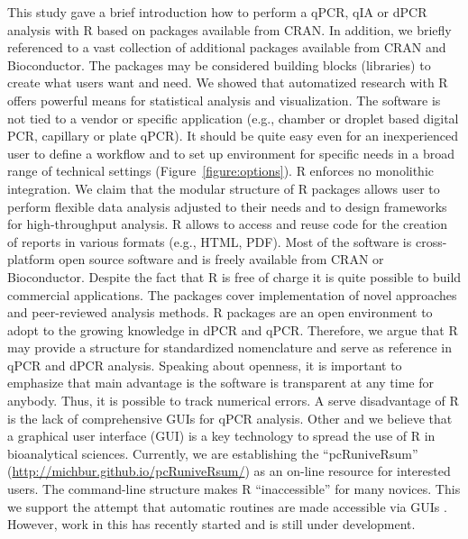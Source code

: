 This study gave a brief introduction how to perform a qPCR, qIA or dPCR analysis 
with R based on packages available from CRAN. In addition, we briefly referenced 
to a vast collection of additional packages available from CRAN and 
Bioconductor. The packages may be considered building blocks (libraries) to 
create what users want and need. We showed that automatized research with R 
offers powerful means for statistical analysis and visualization. The software 
is not tied to a vendor or specific application (e.g., chamber or droplet based 
digital PCR, capillary or plate qPCR). It should be quite easy even for an 
inexperienced user to define a workflow and to set up environment for specific 
needs in a broad range of technical settings (Figure~\ref{figure:options}). R 
enforces no monolithic integration. We claim that the modular structure of R 
packages allows user to perform flexible data analysis adjusted to their needs 
and to design frameworks for high-throughput analysis. R allows to access and 
reuse code for the creation of reports in various formats (e.g., HTML, PDF). 
Most of the software is cross-platform open source software and is freely 
available from CRAN or Bioconductor. Despite the fact that R is free of charge 
it is quite possible to build commercial applications. The packages cover 
implementation of novel approaches and peer-reviewed analysis methods. R 
packages are an open environment to adopt to the growing knowledge in dPCR and 
qPCR. Therefore, we argue that R may provide a structure for standardized 
nomenclature and serve as reference in qPCR and dPCR analysis. Speaking about 
openness, it is important to emphasize that main advantage is the software is 
transparent at any time for anybody. Thus, it is possible to track numerical 
errors.  A serve disadvantage of R is the lack of comprehensive GUIs for qPCR 
analysis. Other and we believe that a graphical user interface (GUI) is a key 
technology to spread the use of R in bioanalytical sciences. Currently, we are 
establishing the ``pcRuniveRsum'' (\url{http://michbur.github.io/pcRuniveRsum/}) 
as an on-line resource for interested users. The command-line structure makes R 
``inaccessible'' for many novices. This we support the attempt that automatic 
routines are made accessible via GUIs \citep{rodiger_rkward_2012}. However, work 
in this has recently started and is still under development.

